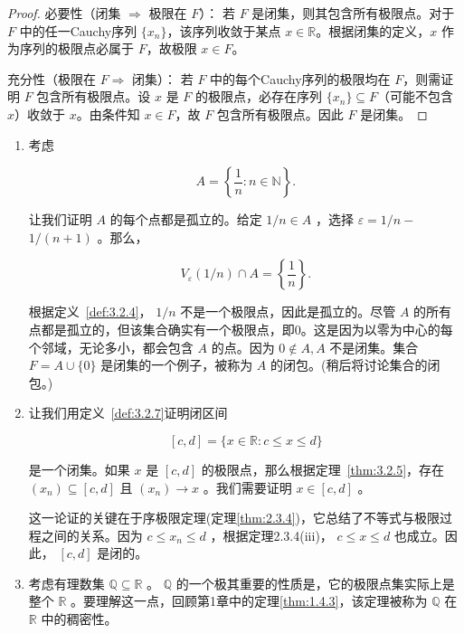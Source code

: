 \begin{proof}
必要性（闭集 $\Rightarrow$ 极限在 $F$）：
若 \(F\) 是闭集，则其包含所有极限点。对于 \(F\) 中的任一Cauchy序列 \(\{x_n\}\)，该序列收敛于某点 \(x \in \mathbb{R}\)。根据闭集的定义，\(x\) 作为序列的极限点必属于 \(F\)，故极限 \(x \in F\)。

充分性（极限在 $F\Rightarrow$  闭集）：
若 \(F\) 中的每个Cauchy序列的极限均在 \(F\)，则需证明 \(F\) 包含所有极限点。设 \(x\) 是 \(F\) 的极限点，必存在序列 \(\{x_n\} \subseteq F\)（可能不包含 \(x\)）收敛于 \(x\)。由条件知 \(x \in F\)，故 \(F\) 包含所有极限点。因此 \(F\) 是闭集。
\end{proof}


\begin{Eg}
  \label{eg:3.2.9}
  \begin{enumerate}[label = (\roman*)]
  \item\label{item:3.2.5} 考虑

\[
A = \left\{  {\frac{1}{n} : n \in  \mathbb{N}}\right\}  .
\]

让我们证明 \(A\) 的每个点都是孤立的。给定 \(1/n \in  A\) ，选择 \(\varepsilon  = 1/n -\)  \(1/\left( {n + 1}\right)\) 。那么，

\[
{V}_{\varepsilon }\left( {1/n}\right)  \cap  A = \left\{  \frac{1}{n}\right\}  .
\]

根据定义~\ref{def:3.2.4}， \(1/n\) 不是一个极限点，因此是孤立的。尽管 \(A\) 的所有点都是孤立的，但该集合确实有一个极限点，即0。这是因为以零为中心的每个邻域，无论多小，都会包含 \(A\) 的点。因为 \(0 \notin  A,A\) 不是闭集。集合 \(F = A \cup  \{ 0\}\) 是闭集的一个例子，被称为 \(A\) 的闭包。(稍后将讨论集合的闭包。)
  \item \label{item:3.2.6}让我们用定义~\ref{def:3.2.7}证明闭区间

\[
\left\lbrack  {c,d}\right\rbrack   = \{ x \in  \mathbb{R} : c \leq  x \leq  d\}
\]

是一个闭集。如果 \(x\) 是 \(\left\lbrack  {c,d}\right\rbrack\) 的极限点，那么根据定理~\ref{thm:3.2.5}，存在 \(\left( {x}_{n}\right)  \subseteq  \left\lbrack  {c,d}\right\rbrack\) 且 \(\left( {x}_{n}\right)  \rightarrow  x\) 。我们需要证明 \(x \in  \left\lbrack  {c,d}\right\rbrack\) 。

这一论证的关键在于序极限定理(定理\ref{thm:2.3.4})，它总结了不等式与极限过程之间的关系。因为 \(c \leq  {x}_{n} \leq  d\) ，根据定理2.3.4(iii)， \(c \leq  x \leq  d\) 也成立。因此， \(\left\lbrack  {c,d}\right\rbrack\) 是闭的。

  \item \label{item:3.2.7}考虑有理数集 \(\mathbb{Q} \subseteq  \mathbb{R}\) 。 \(\mathbb{Q}\) 的一个极其重要的性质是，它的极限点集实际上是整个 \(\mathbb{R}\) 。要理解这一点，回顾第1章中的定理\ref{thm:1.4.3}，该定理被称为 \(\mathbb{Q}\) 在 \(\mathbb{R}\) 中的稠密性。
  \end{enumerate}
\end{Eg}
 

